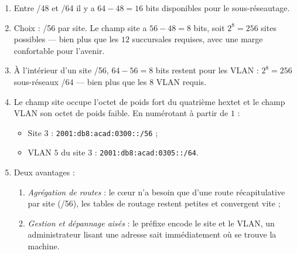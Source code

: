 \documentclass[11pt]{article}
\begin{document}
\begin{corrige}
\begin{enumerate}
\item Entre /48 et /64 il y a $64 - 48 = 16$ bits disponibles pour le sous-réseautage.
\item Choix : /56 par site. Le champ site a $56 - 48 = 8$ bits, soit $2^8 = 256$ sites possibles --- bien plus que les $12$ succursales requises, avec une marge confortable pour l'avenir.
\item À l'intérieur d'un site /56, $64 - 56 = 8$ bits restent pour les VLAN : $2^8 = 256$ sous-réseaux /64 --- bien plus que les $8$ VLAN requis.
\item Le champ site occupe l'octet de poids fort du quatrième hextet et le champ VLAN son octet de poids faible. En numérotant à partir de $1$ :
\begin{itemize}
\item Site $3$ : \texttt{2001:db8:acad:0300::/56} ;
\item VLAN $5$ du site $3$ : \texttt{2001:db8:acad:0305::/64}.
\end{itemize}
\item Deux avantages :
\begin{enumerate}
\item \emph{Agrégation de routes} : le cœur n'a besoin que d'une route récapitulative par site (/56), les tables de routage restent petites et convergent vite ;
\item \emph{Gestion et dépannage aisés} : le préfixe encode le site et le VLAN, un administrateur lisant une adresse sait immédiatement où se trouve la machine.
\end{enumerate}
\end{enumerate}
\end{corrige}
\end{document}
